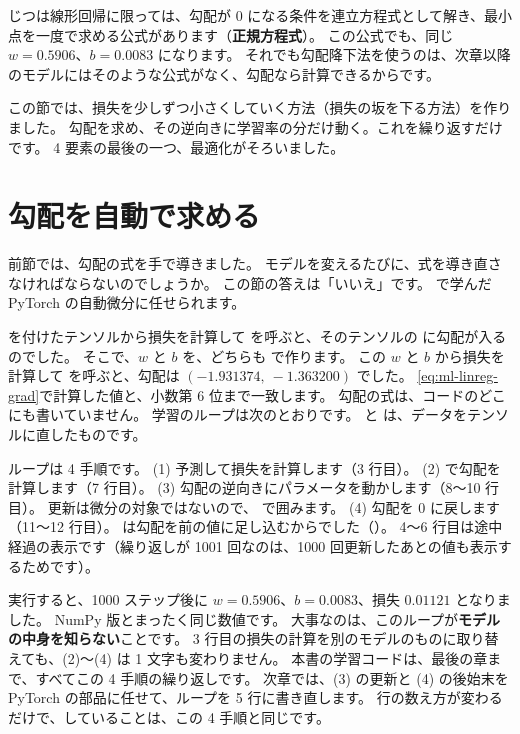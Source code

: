 じつは線形回帰に限っては、勾配が 0 になる条件を連立方程式として解き、最小点を一度で求める公式があります（\textbf{正規方程式}）。
この公式でも、同じ $w=0.5906$、$b=0.0083$ になります。
それでも勾配降下法を使うのは、次章以降のモデルにはそのような公式がなく、勾配なら計算できるからです。

この節では、損失を少しずつ小さくしていく方法（損失の坂を下る方法）を作りました。
勾配を求め、その逆向きに学習率の分だけ動く。これを繰り返すだけです。
4 要素の最後の一つ、最適化がそろいました。

\section{勾配を自動で求める}\label{sec:ml-autograd}

前節では、勾配の式を手で導きました。
モデルを変えるたびに、式を導き直さなければならないのでしょうか。
この節の答えは「いいえ」です。
で学んだ PyTorch の自動微分に任せられます。

 を付けたテンソルから損失を計算して  を呼ぶと、そのテンソルの  に勾配が入るのでした。
そこで、$w$ と $b$ を、どちらも  で作ります。
この $w$ と $b$ から損失を計算して  を呼ぶと、勾配は $(-1.931374,\ -1.363200)$ でした。
\eqref{eq:ml-linreg-grad}で計算した値と、小数第 6 位まで一致します。
勾配の式は、コードのどこにも書いていません。
学習のループは次のとおりです。 と  は、データをテンソルに直したものです。


ループは 4 手順です。
(1) 予測して損失を計算します（3 行目）。
(2)  で勾配を計算します（7 行目）。
(3) 勾配の逆向きにパラメータを動かします（8〜10 行目）。
更新は微分の対象ではないので、 で囲みます。
(4) 勾配を 0 に戻します（11〜12 行目）。
 は勾配を前の値に足し込むからでした（）。
4〜6 行目は途中経過の表示です（繰り返しが 1001 回なのは、1000 回更新したあとの値も表示するためです）。

実行すると、1000 ステップ後に $w=0.5906$、$b=0.0083$、損失 $0.01121$ となりました。
NumPy 版とまったく同じ数値です。
大事なのは、このループが\textbf{モデルの中身を知らない}ことです。
3 行目の損失の計算を別のモデルのものに取り替えても、(2)〜(4) は 1 文字も変わりません。
本書の学習コードは、最後の章まで、すべてこの 4 手順の繰り返しです。
次章では、(3) の更新と (4) の後始末を PyTorch の部品に任せて、ループを 5 行に書き直します。
行の数え方が変わるだけで、していることは、この 4 手順と同じです。

